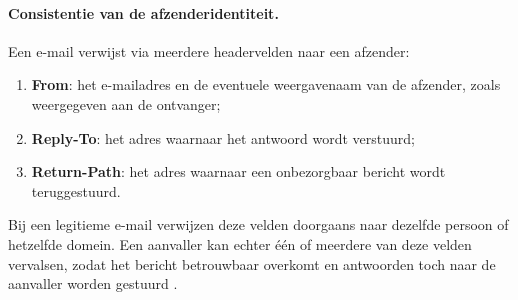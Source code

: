 \paragraph{Consistentie van de afzenderidentiteit.}
Een e-mail verwijst via meerdere headervelden naar een afzender:
\begin{enumerate}
    \item \textbf{From}: het e-mailadres en de eventuele weergavenaam van de afzender, zoals weergegeven aan de ontvanger;
    \item \textbf{Reply-To}: het adres waarnaar het antwoord wordt verstuurd;
    \item \textbf{Return-Path}: het adres waarnaar een onbezorgbaar bericht wordt teruggestuurd.
\end{enumerate}

Bij een legitieme e-mail verwijzen deze velden doorgaans naar dezelfde persoon of hetzelfde domein. Een aanvaller kan echter één of meerdere van deze velden vervalsen, zodat het bericht betrouwbaar overkomt en antwoorden toch naar de aanvaller worden gestuurd \autocite{Hu2018}.

